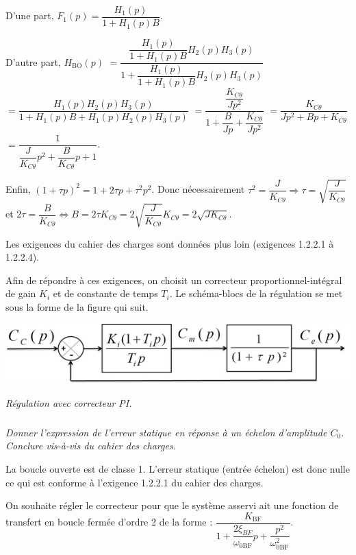 \documentclass[10pt,fleqn]{article} %
\begin{document}
\begin{multicols}{2}
\begin{corrige}
D'une part, $F_1(p)=\dfrac{H_1(p)}{1+H_1(p)B}$. 

D'autre part, 
$H_{\text{BO}}(p)$
$=\dfrac{\dfrac{H_1(p)}{1+H_1(p)B}H_2(p)H_3(p)}{1+\dfrac{H_1(p)}{1+H_1(p)B}H_2(p)H_3(p)}$ 
$=\dfrac{H_1(p)H_2(p)H_3(p)}{1+H_1(p)B+H_1(p)H_2(p)H_3(p)}$
$=\dfrac{\dfrac{K_{C\theta}}{Jp^2}}{1+\dfrac{B}{Jp}+\dfrac{K_{C\theta}}{Jp^2}}$
$=\dfrac{K_{C\theta}}{Jp^2+Bp+K_{C\theta}}$
$=\dfrac{1}{\dfrac{J}{K_{C\theta}}p^2+\dfrac{B}{K_{C\theta}}p+1}$.

Enfin, $\left(1+\tau p\right)^2 = 1+2\tau p + \tau^2p^2$. Donc nécessairement $\tau^2=\dfrac{J}{K_{C\theta}} \Rightarrow \tau=\sqrt{\dfrac{J}{K_{C\theta}}}$ et 
$2\tau = \dfrac{B}{K_{C\theta}} \Leftrightarrow B
=2\tau K_{C\theta}
=2\sqrt{\dfrac{J}{K_{C\theta}}} K_{C\theta}
=2\sqrt{JK_{C\theta}}$.
\end{corrige}
\else
\fi


\ifprof
\else
Les exigences du cahier des charges sont données plus loin (exigences 1.2.2.1 à 1.2.2.4).

Afin de répondre à ces exigences, on choisit un correcteur proportionnel-intégral de gain $K_i$ et de constante de temps $T_i$. Le schéma-blocs de la régulation se met sous la forme de la figure qui suit.

\begin{center}
\includegraphics[width=.7\linewidth]{images/Sujet/images/fig_08}

\textit{Régulation avec correcteur PI.}
\end{center}
\fi

\subparagraph{}
\textit{Donner l’expression de l’erreur statique en réponse à un échelon d'amplitude $C_0$. Conclure vis-à-vis du cahier des charges.}
\ifprof
\begin{corrige}
La boucle ouverte est de classe 1. L'erreur statique (entrée échelon) est donc nulle ce qui est conforme à l'exigence 1.2.2.1 du cahier des charges. 
\end{corrige}
\else
\fi


\ifprof
\else
On souhaite régler le correcteur pour que le système asservi ait une fonction de transfert en boucle fermée
d’ordre 2 de la forme :
$\dfrac{K_{\text{BF}}}{1+\dfrac{2\xi_{BF}}{\omega_{0\text{BF}}}p+\dfrac{p^2}{\omega_{0\text{BF}}^2}}$.
\fi


\end{multicols}
\end{document}
